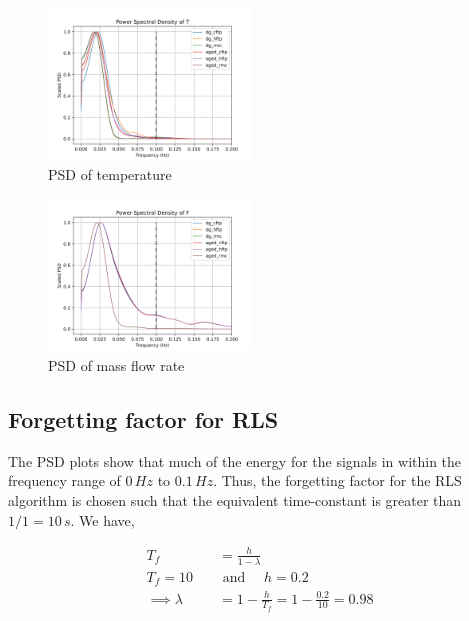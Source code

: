 \begin{multicols}{2}
       \begin{figure}[H]
        \centering
        \includegraphics[width=0.48\textwidth]{./figs/bfr_smth/test_psd/T.png}
        \caption{PSD of temperature}
       \end{figure}

       \begin{figure}[H]
        \centering
        \includegraphics[width=0.48\textwidth]{./figs/bfr_smth/test_psd/F.png}
        \caption{PSD of mass flow rate}
       \end{figure}
\end{multicols}


\subsection{Forgetting factor for RLS}

The PSD plots show that much of the energy for the signals in within the frequency range of $0 \, Hz$ to $0.1 \, Hz$. Thus, the forgetting factor for the RLS algorithm is chosen such that the equivalent time-constant is greater than $1/1 = 10 \, s$. We have,

\begin{align*}
        T_f &= \frac{h}{1 - \lambda}\\
        T_f = 10 \quad &\text{ and } \quad h = 0.2\\
        \implies \lambda &= 1 - \frac{h}{T_f} = 1 - \frac{0.2}{10} = 0.98
\end{align*}
